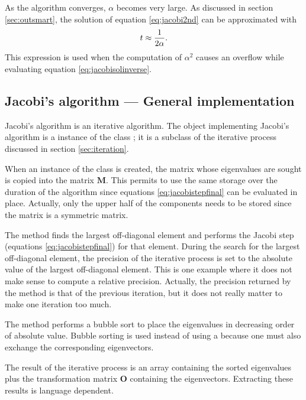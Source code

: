 As the algorithm converges, $\alpha$ becomes very large. As
discussed in section \ref{sec:outsmart}, the solution of equation
\ref{eq:jacobi2nd} can be approximated with
\begin{equation}
  t\approx{\displaystyle 1\over\displaystyle 2\alpha}.
\end{equation}
This expression is used when the computation of $\alpha^2$ causes
an overflow while evaluating equation \ref{eq:jacobisolinverse}.

\subsection{Jacobi's algorithm --- General implementation}
Jacobi's algorithm is an iterative algorithm.
The object implementing Jacobi's algorithm is a instance of the class ; it is a subclass of the iterative process discussed in section \ref{sec:iteration}.

When an instance of the class  is created,
the matrix whose eigenvalues are sought is copied into the matrix
$\textbf{M}$. This permits to use the same storage over the duration
of the algorithm since equations \ref{eq:jacobistepfinal} can be
evaluated in place. Actually, only the upper half of the
components needs to be stored since the matrix is a symmetric
matrix.

The method  finds the largest off-diagonal
element and performs the Jacobi step (equations
\ref{eq:jacobistepfinal}) for that element. During the search for
the largest off-diagonal element, the precision of the iterative
process is set to the absolute value of the largest off-diagonal
element. This is one example where it does not make sense to
compute a relative precision. Actually, the precision returned by
the method  is that of the previous
iteration, but it does not really matter to make one iteration too
much.

The method  performs a bubble sort to
place the eigenvalues in decreasing order of absolute value.
Bubble sorting is used instead of using a 
because one must also exchange the corresponding eigenvectors.

The result of the iterative process is an array containing the
sorted eigenvalues plus the transformation matrix $\textbf{O}$
containing the eigenvectors. Extracting these results is language
dependent.


